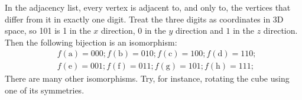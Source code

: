 \documentclass[a4paper, 12pt]{exam}
\begin{document}
\begin{questions}
\begin{solution}
    In the adjacency list, every vertex is adjacent to, and only to, the vertices that differ from it in exactly one digit.
    Treat the three digits as coordinates in 3D space, so 101 is 1 in the $x$ direction, 0 in the $y$ direction and $1$ in the $z$ direction.
    Then the following bijection is an isomorphism:
    \begin{align*}
      &f(\textrm{a}) = 000; f(\textrm{b}) = 010; f(\textrm{c}) = 100; f(\textrm{d}) = 110; \\
      &f(\textrm{e}) = 001; f(\textrm{f}) = 011; f(\textrm{g}) = 101; f(\textrm{h}) = 111;
    \end{align*}
    There are many other isomorphisms.
    Try, for instance, rotating the cube using one of its symmetries.
\end{solution}




\end{questions}





\end{document}
